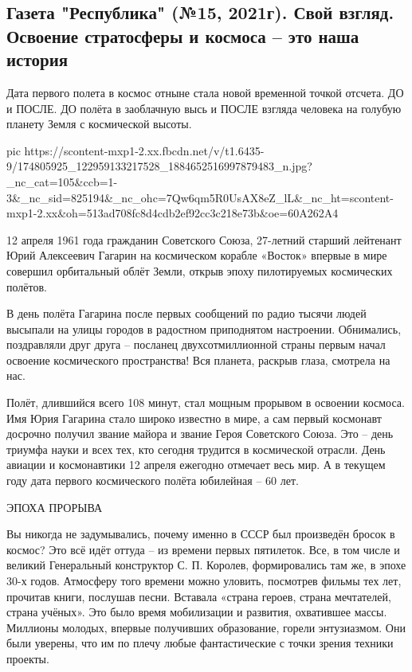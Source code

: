  
 
 
 
 

\subsection{Газета "Республика" (№15, 2021г).  Свой взгляд. Освоение стратосферы и космоса – это наша история}
\label{sec:16_04_2021.fb.respublikalnr.2.kosmos}

Дата первого полета в космос отныне стала новой временной точкой отсчета. ДО и
ПОСЛЕ. ДО полёта в заоблачную высь и ПОСЛЕ взгляда человека на голубую планету
Земля с космической высоты.

\ifcmt
  pic https://scontent-mxp1-2.xx.fbcdn.net/v/t1.6435-9/174805925_122959133217528_1884652516997879483_n.jpg?_nc_cat=105&ccb=1-3&_nc_sid=825194&_nc_ohc=7Qw6qm5R0UsAX8eZ_lL&_nc_ht=scontent-mxp1-2.xx&oh=513ad708fc8d4cdb2ef92cc3c218e73b&oe=60A262A4
\fi

12 апреля 1961 года гражданин Советского Союза, 27-летний старший лейтенант
Юрий Алексеевич Гагарин на космическом корабле «Восток» впервые в мире совершил
орбитальный облёт Земли, открыв эпоху пилотируемых космических полётов. 

В день полёта Гагарина после первых сообщений по радио тысячи людей высыпали на
улицы городов в радостном приподнятом настроении. Обнимались, поздравляли друг
друга – посланец двухсотмиллионной страны первым начал освоение космического
пространства! Вся планета, раскрыв глаза, смотрела на нас.

Полёт, длившийся всего 108 минут, стал мощным прорывом в освоении космоса. Имя
Юрия Гагарина стало широко известно в мире, а сам первый космонавт досрочно
получил звание майора и звание Героя Советского Союза. Это – день триумфа науки
и всех тех, кто сегодня трудится в космической отрасли. День авиации и
космонавтики 12 апреля ежегодно отмечает весь мир. А в текущем году дата
первого космического полёта юбилейная – 60 лет.

ЭПОХА ПРОРЫВА

Вы никогда не задумывались, почему именно в СССР был произведён бросок в
космос? Это всё идёт оттуда – из времени первых пятилеток. Все, в том числе и
великий Генеральный конструктор С. П. Королев, формировались там же, в эпохе
30-х годов. Атмосферу того времени можно уловить, посмотрев фильмы тех лет,
прочитав книги, послушав песни. Вставала «страна героев, страна мечтателей,
страна учёных». Это было время мобилизации и развития, охватившее массы.
Миллионы молодых, впервые получивших образование, горели энтузиазмом. Они были
уверены, что им по плечу любые фантастические с точки зрения техники проекты.

